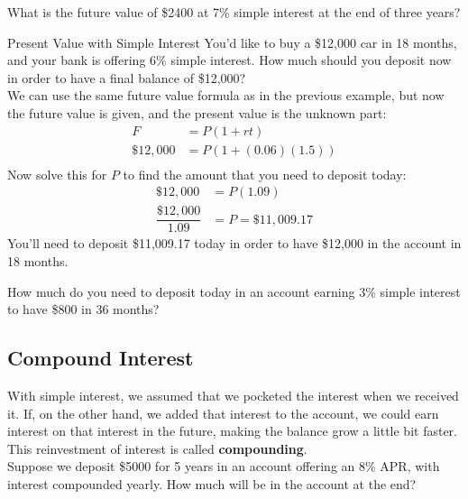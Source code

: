 \begin{try}
What is the future value of \$2400 at 7\% simple interest at the end of three years?
\end{try}

\begin{example}[https://www.youtube.com/watch?v=0GFzH0JPYeY]{Present Value with Simple Interest}
You'd like to buy a \$12,000 car in 18 months, and your bank is offering 6\% simple interest.  How much should you deposit now in order to have a final balance of \$12,000?\\

We can use the same future value formula as in the previous example, but now the future value is given, and the present value is the unknown part:
\begin{align*}
F &= P(1+rt)\\
\$12,000 &= P(1+(0.06)(1.5))\\
\end{align*}
Now solve this for $P$ to find the amount that you need to deposit today:
\begin{align*}
\$12,000 &= P(1.09)\\
\dfrac{\$12,000}{1.09} &= P = \$11,009.17
\end{align*}
You'll need to deposit \$11,009.17 today in order to have \$12,000 in the account in 18 months.
\end{example}

\begin{try}
How much do you need to deposit today in an account earning 3\% simple interest to have \$800 in 36 months?
\end{try}

\subsection{Compound Interest}
With simple interest, we assumed that we pocketed the interest when we received it.  If, on the other hand, we added that interest to the account, we could earn interest on that interest in the future, making the balance grow a little bit faster.  This reinvestment of interest is called \textbf{compounding}.\\

Suppose we deposit \$5000 for 5 years in an account offering an 8\% APR, with interest compounded yearly.  How much will be in the account at the end?

